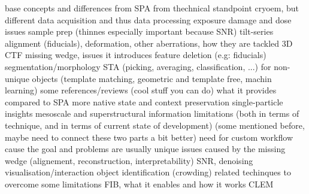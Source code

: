 \begin{outline}
\1 \tick base concepts and differences from SPA from thechnical standpoint
    \2 \tick cryoem, but different data acquisition and thus data processing
    \2 \tick exposure damage and dose issues
    \2 \tick sample prep (thinnes especially important because SNR)
    \2 \tick tilt-series alignment (fiducials), deformation, other aberrations, how they are tackled
    \2 \tick 3D CTF
    \2 \tick missing wedge, issues it introduces
    \2 \tick feature deletion (e.g: fiducials)
    \2 \tick segmentation/morphology
    \2 \tick STA (picking, averaging, classification, ...) for non-unique objects (template matching, geometric and template free, machin learning)
\1 \tick some references/reviews (cool stuff you can do)
    \2 \tick \cite{turkPromiseChallengesCryoelectron2020,lucicCryoelectronTomographyChallenge2013}
\1 what it provides compared to SPA
    \2 \tick more native state and context preservation
    \2 \tick single-particle insights
    \2 \tick mesoscale and superstructural information
\1 limitations (both in terms of technique, and in terms of current state of development)
    \2 \tick (some mentioned before, maybe need to connect these two parts a bit better)
    \2 \tick need for custom workflow cause the goal and problems are usually unique
    \2 \tick issues caused by the missing wedge (alignement, reconstruction, interpretability)
    \2 \tick SNR, denoising
    \2 visualisation/interaction
    \2 object identification (crowding)
\1 related techinques to overcome some limitations
    \2 \tick FIB, what it enables and how it works
    \2 CLEM
\end{outline}
